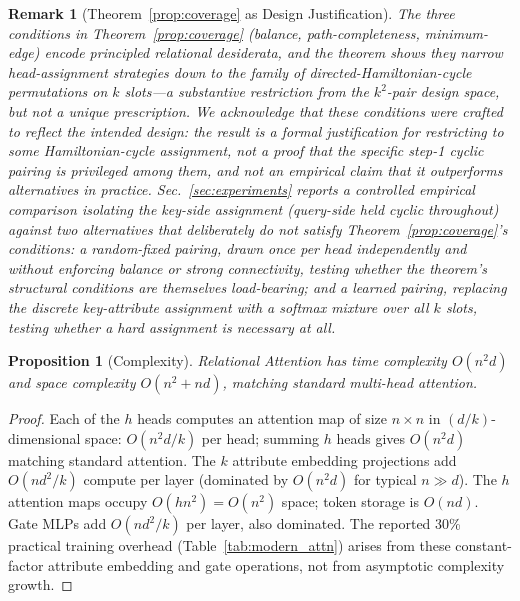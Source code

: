 \documentclass[review]{elsarticle}
\newtheorem{proposition}[theorem]{Proposition}
\newtheorem{remark}[theorem]{Remark}
\begin{document}
\begin{remark}[Theorem~\ref{prop:coverage} as Design Justification]
\label{rem:cyclic_design}
The three conditions in Theorem~\ref{prop:coverage} (balance, path-completeness, minimum-edge) encode principled relational desiderata, and the theorem shows they narrow head-assignment strategies down to the family of directed-Hamiltonian-cycle permutations on $k$ slots---a substantive restriction from the $k^2$-pair design space, but not a unique prescription. We acknowledge that these conditions were crafted to reflect the intended design: the result is a formal justification for restricting to \emph{some} Hamiltonian-cycle assignment, not a proof that the specific step-1 cyclic pairing is privileged among them, and not an empirical claim that it outperforms alternatives in practice. Sec.~\ref{sec:experiments} reports a controlled empirical comparison isolating the key-side assignment (query-side held cyclic throughout) against two alternatives that deliberately do \emph{not} satisfy Theorem~\ref{prop:coverage}'s conditions: a random-fixed pairing, drawn once per head independently and without enforcing balance or strong connectivity, testing whether the theorem's structural conditions are themselves load-bearing; and a learned pairing, replacing the discrete key-attribute assignment with a softmax mixture over all $k$ slots, testing whether a hard assignment is necessary at all.
\end{remark}

\begin{proposition}[Complexity]
Relational Attention has time complexity $O(n^2 d)$ and space complexity $O(n^2 + nd)$, matching standard multi-head attention.
\end{proposition}

\begin{proof}
	\renewcommand{\qedsymbol}{}
Each of the $h$ heads computes an attention map of size $n \times n$ in $(d/k)$-dimensional space: $O(n^2 d/k)$ per head; summing $h$ heads gives $O(n^2 d)$ matching standard attention. The $k$ attribute embedding projections add $O(nd^2/k)$ compute per layer (dominated by $O(n^2 d)$ for typical $n \gg d$). The $h$ attention maps occupy $O(hn^2) = O(n^2)$ space; token storage is $O(nd)$. Gate MLPs add $O(nd^2/k)$ per layer, also dominated. The reported 30\% practical training overhead (Table~\ref{tab:modern_attn}) arises from these constant-factor attribute embedding and gate operations, not from asymptotic complexity growth.
\end{proof}
\end{document}
